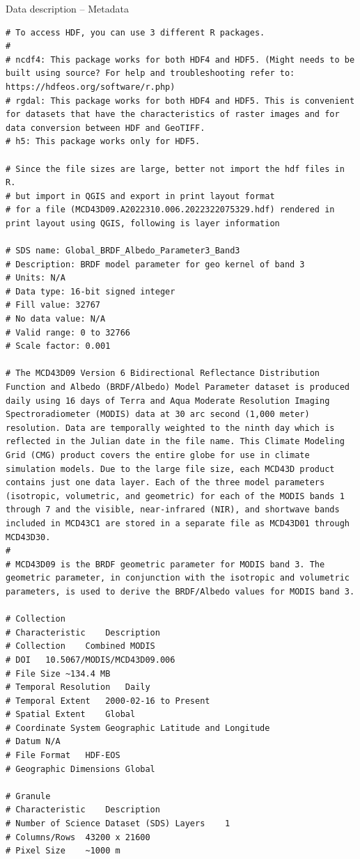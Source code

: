\documentclass[10pt,dvipsnames,ignorenonframetext,aspectratio=169]{beamer}
\begin{document}
\begin{frame}[fragile]{Data description -- Metadata}
\begin{verbatim}
# To access HDF, you can use 3 different R packages.
# 
# ncdf4: This package works for both HDF4 and HDF5. (Might needs to be built using source? For help and troubleshooting refer to: https://hdfeos.org/software/r.php)
# rgdal: This package works for both HDF4 and HDF5. This is convenient for datasets that have the characteristics of raster images and for data conversion between HDF and GeoTIFF.
# h5: This package works only for HDF5.

# Since the file sizes are large, better not import the hdf files in R.
# but import in QGIS and export in print layout format
# for a file (MCD43D09.A2022310.006.2022322075329.hdf) rendered in print layout using QGIS, following is layer information

# SDS name: Global_BRDF_Albedo_Parameter3_Band3
# Description: BRDF model parameter for geo kernel of band 3
# Units: N/A
# Data type: 16-bit signed integer
# Fill value: 32767
# No data value: N/A
# Valid range: 0 to 32766
# Scale factor: 0.001

# The MCD43D09 Version 6 Bidirectional Reflectance Distribution Function and Albedo (BRDF/Albedo) Model Parameter dataset is produced daily using 16 days of Terra and Aqua Moderate Resolution Imaging Spectroradiometer (MODIS) data at 30 arc second (1,000 meter) resolution. Data are temporally weighted to the ninth day which is reflected in the Julian date in the file name. This Climate Modeling Grid (CMG) product covers the entire globe for use in climate simulation models. Due to the large file size, each MCD43D product contains just one data layer. Each of the three model parameters (isotropic, volumetric, and geometric) for each of the MODIS bands 1 through 7 and the visible, near-infrared (NIR), and shortwave bands included in MCD43C1 are stored in a separate file as MCD43D01 through MCD43D30.
# 
# MCD43D09 is the BRDF geometric parameter for MODIS band 3. The geometric parameter, in conjunction with the isotropic and volumetric parameters, is used to derive the BRDF/Albedo values for MODIS band 3.

# Collection
# Characteristic    Description
# Collection    Combined MODIS
# DOI   10.5067/MODIS/MCD43D09.006
# File Size ~134.4 MB
# Temporal Resolution   Daily
# Temporal Extent   2000-02-16 to Present
# Spatial Extent    Global
# Coordinate System Geographic Latitude and Longitude
# Datum N/A
# File Format   HDF-EOS
# Geographic Dimensions Global

# Granule
# Characteristic    Description
# Number of Science Dataset (SDS) Layers    1
# Columns/Rows  43200 x 21600
# Pixel Size    ~1000 m
\end{verbatim}
\end{frame}
\end{document}
